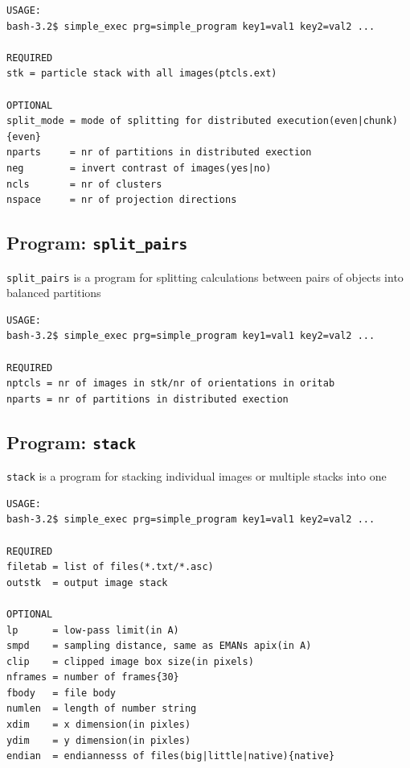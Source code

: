 \documentclass[a4paper,11pt]{article}
\newcommand{\prgname}[1]{\textcolor{NavyBlue}{\texttt{#1}}}
\begin{document}
\begin{verbatim}
USAGE:
bash-3.2$ simple_exec prg=simple_program key1=val1 key2=val2 ...

REQUIRED
stk = particle stack with all images(ptcls.ext)

OPTIONAL
split_mode = mode of splitting for distributed execution(even|chunk){even}
nparts     = nr of partitions in distributed exection
neg        = invert contrast of images(yes|no)
ncls       = nr of clusters
nspace     = nr of projection directions
\end{verbatim}

\subsection{Program: \prgname{split\_pairs}}
\label{split_pairs}
\prgname{split\_pairs} is a program for splitting calculations between pairs of objects into balanced partitions

\begin{verbatim}
USAGE:
bash-3.2$ simple_exec prg=simple_program key1=val1 key2=val2 ...

REQUIRED
nptcls = nr of images in stk/nr of orientations in oritab
nparts = nr of partitions in distributed exection
\end{verbatim}

\subsection{Program: \prgname{stack}}
\label{stack}
\prgname{stack} is a program for stacking individual images or multiple stacks into one

\begin{verbatim}
USAGE:
bash-3.2$ simple_exec prg=simple_program key1=val1 key2=val2 ...

REQUIRED
filetab = list of files(*.txt/*.asc)
outstk  = output image stack

OPTIONAL
lp      = low-pass limit(in A)
smpd    = sampling distance, same as EMANs apix(in A)
clip    = clipped image box size(in pixels)
nframes = number of frames{30}
fbody   = file body
numlen  = length of number string
xdim    = x dimension(in pixles)
ydim    = y dimension(in pixles)
endian  = endiannesss of files(big|little|native){native}
\end{verbatim}
\end{document}
